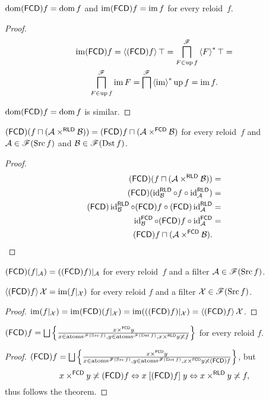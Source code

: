 \begin{prop}
$\operatorname{dom}(\mathsf{FCD}) f=\operatorname{dom} f$ and $\operatorname{im}(\mathsf{FCD}) f=\operatorname{im} f$ for every reloid~$f$.\end{prop}
\begin{proof}
~
\begin{multline*}
\operatorname{im}(\mathsf{FCD}) f=\left\langle (\mathsf{FCD}) f\right\rangle\top=\bigsqcap_{F\in\operatorname{up} f}^{\mathscr{F}}\left\langle F\right\rangle ^{\ast}\top=\\
\bigsqcap_{F\in\operatorname{up} f}^{\mathscr{F}}\operatorname{im} F=\bigsqcap^{\mathscr{F}}\left\langle \operatorname{im}\right\rangle ^{\ast}\operatorname{up} f=\operatorname{im} f.
\end{multline*}


$\operatorname{dom}(\mathsf{FCD}) f=\operatorname{dom} f$ is similar.\end{proof}
\begin{prop}\label{fcd-meet-prod-rld}
$(\mathsf{FCD})(f\sqcap(\mathcal{A}\times^{\mathsf{RLD}}\mathcal{B}))=(\mathsf{FCD}) f\sqcap(\mathcal{A}\times^{\mathsf{FCD}}\mathcal{B})$
for every reloid~$f$ and $\mathcal{A}\in\mathscr{F}(\operatorname{Src} f)$ and
$\mathcal{B}\in\mathscr{F}(\operatorname{Dst} f)$.\end{prop}
\begin{proof}
~
\begin{align*}
(\mathsf{FCD})(f\sqcap(\mathcal{A}\times^{\mathsf{RLD}}\mathcal{B})) & =\\
(\mathsf{FCD})(\operatorname{id}_{\mathcal{B}}^{\mathsf{RLD}}\circ f\circ\operatorname{id}_{\mathcal{A}}^{\mathsf{RLD}}) & =\\
(\mathsf{FCD})\operatorname{id}_{\mathcal{B}}^{\mathsf{RLD}}\circ(\mathsf{FCD}) f\circ(\mathsf{FCD})\operatorname{id}_{\mathcal{A}}^{\mathsf{RLD}} & =\\
\operatorname{id}_{\mathcal{B}}^{\mathsf{FCD}}\circ(\mathsf{FCD}) f\circ\operatorname{id}_{\mathcal{A}}^{\mathsf{FCD}} & =\\
(\mathsf{FCD}) f\sqcap(\mathcal{A}\times^{\mathsf{FCD}}\mathcal{B}).
\end{align*}
\end{proof}
\begin{cor}
$(\mathsf{FCD})(f|_{\mathcal{A}})=((\mathsf{FCD}) f)|_{\mathcal{A}}$ for every reloid~$f$
and a filter $\mathcal{A}\in\mathscr{F}(\operatorname{Src} f)$.\end{cor}
\begin{prop}
$\left\langle (\mathsf{FCD}) f\right\rangle\mathcal{X}=\operatorname{im}(f|_{\mathcal{X}})$ for every reloid
$f$ and a filter $\mathcal{X}\in\mathscr{F}(\operatorname{Src} f)$.\end{prop}
\begin{proof}
$\operatorname{im}(f|_{\mathcal{X}})=\operatorname{im}(\mathsf{FCD})(f|_{\mathcal{X}})=\operatorname{im}(((\mathsf{FCD}) f)|_{\mathcal{X}})=\left\langle (\mathsf{FCD}) f\right\rangle\mathcal{X}$.\end{proof}
\begin{prop}
$\tofcd f=\bigsqcup\setcond{x\times^{\mathsf{FCD}}y}{x\in\atoms^{\mathscr{F}(\Src f)},y\in\atoms^{\mathscr{F}(\Dst f)},x\times^{\mathsf{RLD}}y\nasymp f}$
for every reloid $f$.\end{prop}
\begin{proof}
$\tofcd f=\bigsqcup\setcond{x\times^{\mathsf{FCD}}y}{x\in\atoms^{\mathscr{F}(\Src f)},y\in\atoms^{\mathscr{F}(\Dst f)},x\times^{\mathsf{FCD}}y\nasymp\tofcd f}$,
but \[x\times^{\mathsf{FCD}}y\not\asymp(\mathsf{FCD}) f\Leftrightarrow x\mathrel{\left[(\mathsf{FCD}) f\right]}y\Leftrightarrow x\times^{\mathsf{RLD}}y\not\asymp f,\]
thus follows the theorem.
\end{proof}

